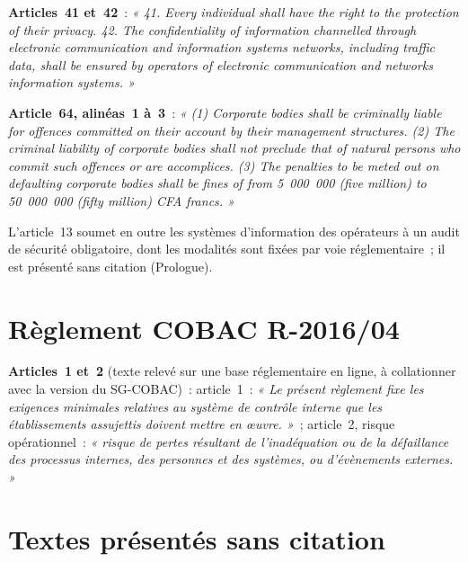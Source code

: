 \begin{boxjuris}
\medskip
\textbf{Articles~41 et~42}~: \textit{« 41. Every individual shall have the
right to the protection of their privacy. \textelp{} 42. The confidentiality
of information channelled through electronic communication and information
systems networks, including traffic data, shall be ensured by operators of
electronic communication and networks information systems. »}

\medskip
\textbf{Article~64, alinéas~1 à~3}~: \textit{« (1) Corporate bodies shall be
criminally liable for offences committed on their account by their
management structures. (2) The criminal liability of corporate bodies shall
not preclude that of natural persons who commit such offences or are
accomplices. (3) The penalties to be meted out on defaulting corporate
bodies shall be fines of from 5~000~000 (five million) to 50~000~000 (fifty
million) CFA francs. »}
\end{boxjuris}

L'article~13 soumet en outre les systèmes d'information des opérateurs à un
audit de sécurité obligatoire, dont les modalités sont fixées par voie
réglementaire~; il est présenté sans citation (Prologue).

\section*{Règlement COBAC R-2016/04}

\begin{boxjuris}
\textbf{Articles~1 et~2} (texte relevé sur une base réglementaire en ligne,
à collationner avec la version du SG-COBAC)~: article~1~: \textit{« Le
présent règlement fixe les exigences minimales relatives au système de
contrôle interne que les établissements assujettis doivent mettre en
œuvre. »}~; article~2, risque opérationnel~: \textit{« risque de pertes
résultant de l'inadéquation ou de la défaillance des processus internes, des
personnes et des systèmes, ou d'évènements externes. »}
\end{boxjuris}

\section*{Textes présentés sans citation}

